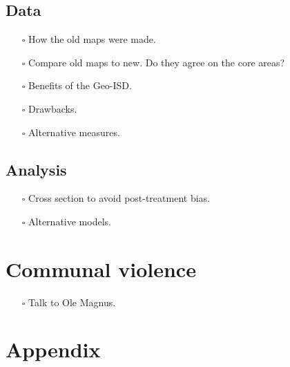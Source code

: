 \documentclass[12pt]{article}
\begin{document}
\subsection{Data}
\begin{itemize}
	\item[$\square$] How the old maps were made.
	\item[$\square$] Compare old maps to new. Do they agree on the core
		areas?
	\item[$\square$] Benefits of the Geo-ISD.
	\item[$\square$] Drawbacks.
	\item[$\square$] Alternative measures.
\end{itemize}

\subsection{Analysis}
\begin{itemize}
	\item[$\square$] Cross section to avoid post-treatment bias.
	\item[$\square$] Alternative models.
\end{itemize}

\section{Communal violence}
\begin{itemize}
	\item[$\square$] Talk to Ole Magnus.
\end{itemize}
\section{}

\section{}

\pagebreak


{}

\section{Appendix}
\end{document}
